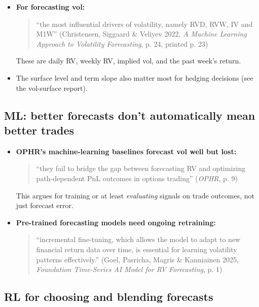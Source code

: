 \documentclass{article}
\begin{document}
\begin{itemize}

\item \textbf{For forecasting vol:}

\begin{quote}``the most influential drivers of volatility, namely RVD, RVW, IV and M1W'' (Christensen, Siggaard \& Veliyev 2022, \emph{A Machine Learning Approach to Volatility Forecasting}, p. 24, printed p. 23)\end{quote}

These are daily RV, weekly RV, implied vol, and the past week's return.

\item The surface level and term slope also matter most for hedging decisions (see the vol-surface report).

\end{itemize}

\subsection{ML: better forecasts don't automatically mean better trades}

\begin{itemize}

\item \textbf{OPHR's machine-learning baselines forecast vol well but lost:}

\begin{quote}``they fail to bridge the gap between forecasting RV and optimizing path-dependent PnL outcomes in options trading'' (\emph{OPHR}, p. 9)\end{quote}

This argues for training or at least \emph{evaluating} signals on trade outcomes, not just forecast error.

\item \textbf{Pre-trained forecasting models need ongoing retraining:}

\begin{quote}``incremental fine-tuning, which allows the model to adapt to new financial return data over time, is essential for learning volatility patterns effectively.'' (Goel, Pasricha, Magris \& Kanniainen 2025, \emph{Foundation Time-Series AI Model for RV Forecasting}, p. 1)\end{quote}

\end{itemize}

\subsection{RL for choosing and blending forecasts}
\end{document}

